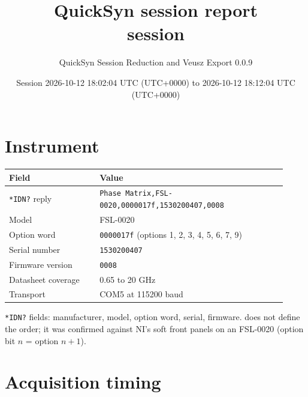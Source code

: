 \documentclass[11pt]{article}
\title{QuickSyn session report\\[0.3em]\large session}
\author{QuickSyn Session Reduction and Veusz Export 0.0.9}
\date{Session 2026-10-12 18:02:04 UTC (UTC+0000) to 2026-10-12 18:12:04 UTC (UTC+0000)}
\begin{document}
\maketitle
\thispagestyle{fancy}
\tableofcontents
\clearpage

\section{Instrument}

\begin{center}
\begin{tabular}{@{}p{0.3\linewidth}p{0.62\linewidth}@{}}
\toprule
\textbf{Field} & \textbf{Value} \\
\midrule
\texttt{*IDN?} reply & \texttt{Phase Matrix,FSL-0020,0000017f,1530200407,0008} \\
Model & FSL-0020 \\
Option word & \texttt{0000017f} (options 1, 2, 3, 4, 5, 6, 7, 9) \\
Serial number & \texttt{1530200407} \\
Firmware version & \texttt{0008} \\
Datasheet coverage & 0.65 to 20 GHz \\
Transport & COM5 at 115200 baud \\
\bottomrule
\end{tabular}
\end{center}

\texttt{*IDN?} fields: manufacturer, model, option word, serial, firmware.
\cite{nicomms} does not define the order; it was confirmed against NI's
soft front panels on an FSL-0020 (option bit $n$ = option $n+1$).

\section{Acquisition timing}
\end{document}
